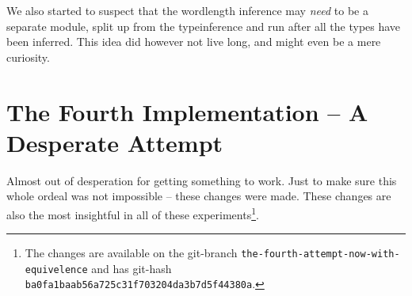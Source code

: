 We also started to suspect that the wordlength inference may \textit{need} to be a separate module, split up from the typeinference and run after all the types have been inferred. This idea did however not live long, and might even be a mere curiosity.

\section{The Fourth Implementation -- A Desperate Attempt}
\label{sec:Forth}

Almost out of desperation for getting something to work. Just to make sure this whole ordeal was not impossible -- these changes were made. These changes are also the most insightful in all of these experiments\cprotect\footnote{The changes are available on the git-branch \verb+the-fourth-attempt-now-with-equivelence+ and has git-hash \verb+ba0fa1baab56a725c31f703204da3b7d5f44380a+.}.

